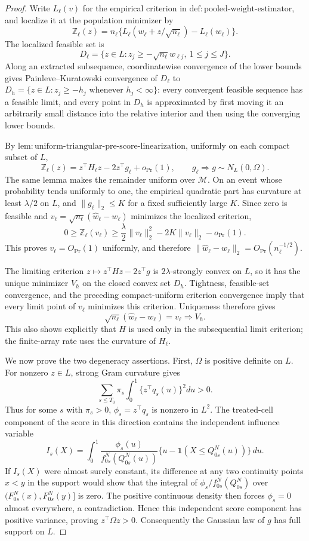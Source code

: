 \documentclass{article}
\begin{document}
\begin{proof}
Write \(L_\ell(v)\) for the empirical criterion in \(\mathrm{def:pooled\mbox{-}weight\mbox{-}estimator}\), and localize it at the population minimizer by
\[
 \mathbb Z_\ell(z)=n_\ell\{L_\ell(w_\ell+z/\sqrt{n_\ell})-L_\ell(w_\ell)\}.
\]
The localized feasible set is
\[
 D_\ell=\{z\in L:z_j\geq-\sqrt{n_\ell}w_{\ell j},\ 1\leq j\leq J\}.
\]
Along an extracted subsequence, coordinatewise convergence of the lower bounds gives Painleve--Kuratowski convergence of \(D_\ell\) to
\(D_h=\{z\in L:z_j\geq-h_j\text{ whenever }h_j<\infty\}\): every convergent feasible sequence has a feasible limit, and every point in \(D_h\) is approximated by first moving it an arbitrarily small distance into the relative interior and then using the converging lower bounds.

By \(\mathrm{lem:uniform\mbox{-}triangular\mbox{-}pre\mbox{-}score\mbox{-}linearization}\), uniformly on each compact subset of \(L\),
\[
 \mathbb Z_\ell(z)=z^\top H_\ell z-2z^\top g_\ell+o_{\Pr}(1),
 \qquad g_\ell\Rightarrow g\sim N_L(0,\Omega).
\]
The same lemma makes the remainder uniform over \(\mathcal M\).  On an event whose probability tends uniformly to one, the empirical quadratic part has curvature at least \(\lambda/2\) on \(L\), and \(\|g_\ell\|_2\leq K\) for a fixed sufficiently large \(K\).  Since zero is feasible and \(v_\ell=\sqrt{n_\ell}(\widehat w_\ell-w_\ell)\) minimizes the localized criterion,
\[
 0\geq \mathbb Z_\ell(v_\ell)
 \geq \frac\lambda2\|v_\ell\|_2^2-2K\|v_\ell\|_2-o_{\Pr}(1).
\]
This proves \(v_\ell=O_{\Pr}(1)\) uniformly, and therefore
\(\|\widehat w_\ell-w_\ell\|_2=O_{\Pr}(n_\ell^{-1/2})\).

The limiting criterion \(z\mapsto z^\top Hz-2z^\top g\) is \(2\lambda\)-strongly convex on \(L\), so it has the unique minimizer \(V_h\) on the closed convex set \(D_h\).  Tightness, feasible-set convergence, and the preceding compact-uniform criterion convergence imply that every limit point of \(v_\ell\) minimizes this criterion.  Uniqueness therefore gives
\[
 \sqrt{n_\ell}(\widehat w_\ell-w_\ell)=v_\ell\Rightarrow V_h.
\]
This also shows explicitly that \(H\) is used only in the subsequential limit criterion; the finite-array rate uses the curvature of \(H_\ell\).

We now prove the two degeneracy assertions.  First, \(\Omega\) is positive definite on \(L\).  For nonzero \(z\in L\), strong Gram curvature gives
\[
 \sum_{s\leq T_0}\pi_s\int_0^1\{z^\top q_s(u)\}^2du>0.
\]
Thus for some \(s\) with \(\pi_s>0\), \(\phi_s=z^\top q_s\) is nonzero in \(L^2\).  The treated-cell component of the score in this direction contains the independent influence variable
\[
 I_s(X)=\int_0^1\frac{\phi_s(u)}{f^N_{0s}(Q^N_{0s}(u))}
       \{u-\mathbf 1(X\leq Q^N_{0s}(u))\}\,du.
\]
If \(I_s(X)\) were almost surely constant, its difference at any two continuity points \(x<y\) in the support would show that the integral of \(\phi_s/f^N_{0s}(Q^N_{0s})\) over \((F^N_{0s}(x),F^N_{0s}(y)]\) is zero.  The positive continuous density then forces \(\phi_s=0\) almost everywhere, a contradiction.  Hence this independent score component has positive variance, proving \(z^\top\Omega z>0\).  Consequently the Gaussian law of \(g\) has full support on \(L\).


\end{proof}
\end{document}
